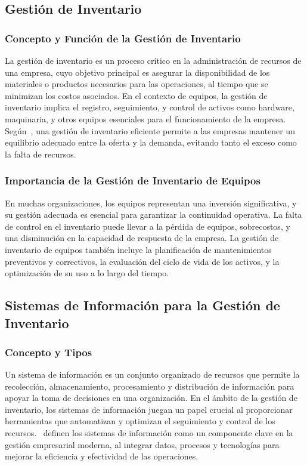 \documentclass[stu, 12pt, letterpaper, donotrepeattitle, floatsintext, natbib]{apa7}
\begin{document}
\subsection{Gestión de Inventario}
\subsubsection{Concepto y Función de la Gestión de Inventario}
La gestión de inventario es un proceso crítico en la administración de recursos de una empresa, cuyo objetivo principal es asegurar la
disponibilidad de los materiales o productos necesarios para las operaciones, al tiempo que se minimizan los costos asociados. En el contexto
de equipos, la gestión de inventario implica el registro, seguimiento, y control de activos como hardware, maquinaria, y otros equipos
esenciales para el funcionamiento de la empresa. Según~\cite{cja}, una gestión de inventario eficiente permite a las empresas mantener un
equilibrio adecuado entre la oferta y la demanda, evitando tanto el exceso como la falta de recursos.
\subsubsection{Importancia de la Gestión de Inventario de Equipos}
En muchas organizaciones, los equipos representan una inversión significativa, y su gestión adecuada es esencial para garantizar la continuidad
operativa. La falta de control en el inventario puede llevar a la pérdida de equipos, sobrecostos, y una disminución en la capacidad de
respuesta de la empresa. La gestión de inventario de equipos también incluye la planificación de mantenimientos preventivos y correctivos, la
evaluación del ciclo de vida de los activos, y la optimización de su uso a lo largo del tiempo.
\subsection{Sistemas de Información para la Gestión de Inventario}
\subsubsection{Concepto y Tipos}
Un sistema de información es un conjunto organizado de recursos que permite la recolección, almacenamiento, procesamiento y distribución de
información para apoyar la toma de decisiones en una organización. En el ámbito de la gestión de inventario, los sistemas de información juegan
un papel crucial al proporcionar herramientas que automatizan y optimizan el seguimiento y control de los recursos.~\cite{om} definen los
sistemas de información como un componente clave en la gestión empresarial moderna, al integrar datos, procesos y tecnologías para mejorar la
eficiencia y efectividad de las operaciones.
\end{document}
